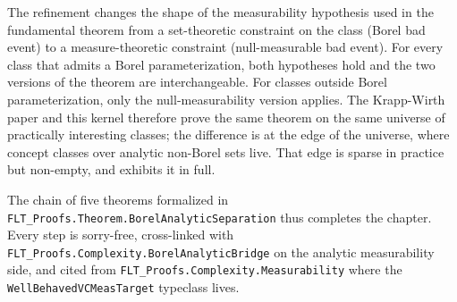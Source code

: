 \begin{remark}
The refinement changes the shape of the measurability hypothesis
used in the fundamental theorem from a set-theoretic constraint on
the class (Borel bad event) to a measure-theoretic constraint
(null-measurable bad event). For every class that admits a Borel
parameterization, both hypotheses hold and the two versions of the
theorem are interchangeable. For classes outside Borel
parameterization, only the null-measurability version applies. The
Krapp-Wirth paper and this kernel therefore prove the same theorem
on the same universe of practically interesting classes; the
difference is at the edge of the universe, where concept classes
over analytic non-Borel sets live. That edge is sparse in practice
but non-empty, and
 exhibits it in full.
\end{remark}

The chain of five theorems formalized in
\texttt{FLT\_Proofs.Theorem.BorelAnalyticSeparation} thus completes
the chapter. Every step is sorry-free, cross-linked with
\texttt{FLT\_Proofs.Complexity.BorelAnalyticBridge} on the analytic
measurability side, and cited from
\texttt{FLT\_Proofs.Complexity.Measurability} where the
\texttt{WellBehavedVCMeasTarget} typeclass lives.
